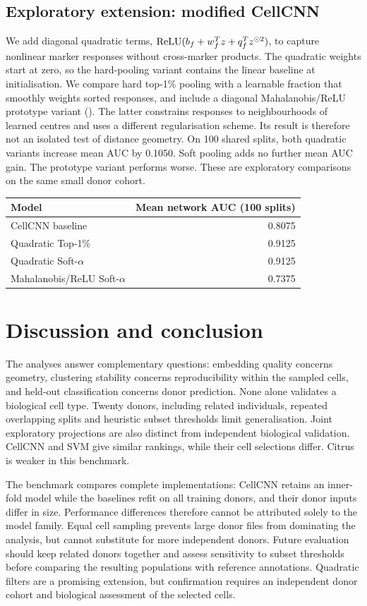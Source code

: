 \documentclass[11pt,a4paper]{article}
\begin{document}
\clearpage
\subsection{Exploratory extension: modified CellCNN}
\label{sec:bonus}
We add diagonal quadratic terms, $\operatorname{ReLU}(b_f+w_f^Tz+q_f^Tz^{\odot2})$, to capture nonlinear marker responses without cross-marker products. The quadratic weights start at zero, so the hard-pooling variant contains the linear baseline at initialisation. We compare hard top-1\% pooling with a learnable fraction that smoothly weights sorted responses, and include a diagonal Mahalanobis/ReLU prototype variant (). The latter constrains responses to neighbourhoods of learned centres and uses a different regularisation scheme. Its result is therefore not an isolated test of distance geometry. On 100 shared splits, both quadratic variants increase mean AUC by 0.1050. Soft pooling adds no further mean AUC gain. The prototype variant performs worse. These are exploratory comparisons on the same small donor cohort.

\begin{center}\small
\begin{tabular}{@{}lr@{}}\toprule
Model & Mean network AUC (100 splits)\\\midrule
CellCNN baseline & 0.8075\\
Quadratic Top-1\% & 0.9125\\
Quadratic Soft-$\alpha$ & 0.9125\\
Mahalanobis/ReLU Soft-$\alpha$ & 0.7375\\\bottomrule
\end{tabular}
\end{center}

\section{Discussion and conclusion}
The analyses answer complementary questions: embedding quality concerns geometry, clustering stability concerns reproducibility within the sampled cells, and held-out classification concerns donor prediction. None alone validates a biological cell type. Twenty donors, including related individuals, repeated overlapping splits and heuristic subset thresholds limit generalisation. Joint exploratory projections are also distinct from independent biological validation. CellCNN and SVM give similar rankings, while their cell selections differ. Citrus is weaker in this benchmark.

The benchmark compares complete implementations: CellCNN retains an inner-fold model while the baselines refit on all training donors, and their donor inputs differ in size. Performance differences therefore cannot be attributed solely to the model family. Equal cell sampling prevents large donor files from dominating the analysis, but cannot substitute for more independent donors. Future evaluation should keep related donors together and assess sensitivity to subset thresholds before comparing the resulting populations with reference annotations. Quadratic filters are a promising extension, but confirmation requires an independent donor cohort and biological assessment of the selected cells.


\end{document}
